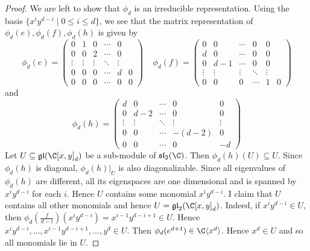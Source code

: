 \documentclass[a4paper]{article}
\begin{document}
\begin{prp}{}{}
\begin{proof}
We are left to show that $\phi_d$ is an irreducible representation. Using the basis $\{x^iy^{d-i}\;|\;0\leq i\leq d\}$, we see that the matrix representation of $\phi_d(e),\phi_d(f),\phi_d(h)$ is given by $$\phi_d(e)=\begin{pmatrix}
0 & 1 & 0 & \cdots & 0\\
0 & 0 & 2 & \cdots & 0\\
\vdots & \vdots & \vdots & \ddots & \vdots \\
0 & 0 & 0 & \cdots & d & 0\\
0 & 0 & 0 & \cdots & 0 & 0
\end{pmatrix}\;\;\;\;\phi_d(f)=\begin{pmatrix}
0 & 0 & \cdots & 0 & 0\\
d & 0 & \cdots & 0 & 0\\
0 & d-1 & \cdots & 0 & 0\\
\vdots & \vdots & \vdots & \ddots & \vdots \\
0 & 0 & 0 & \cdots & 1 & 0
\end{pmatrix}$$ and $$\phi_d(h)=\begin{pmatrix}
d & 0 & \cdots & 0 & 0\\
0 & d-2 & \cdots & 0 & 0\\
\vdots & \vdots & \ddots & \vdots & \vdots\\
0 & 0 & \cdots & -(d-2) & 0\\
0 & 0 & \cdots & 0 & -d
\end{pmatrix}$$
Let $U\subseteq\mathfrak{gl}(\C[x,y]_d)$ be a sub-module of $\mathfrak{sl}_2(\C)$. Then $\phi_d(h)(U)\subseteq U$. Since $\phi_d(h)$ is diagonal, $\phi_d(h)|_U$ is also diagonalizable. Since all eigenvalues of $\phi_d(h)$ are different, all its eigenspaces are one dimensional and is spanned by $x^iy^{d-i}$ for each $i$. Hence $U$ contains some monomial $x^iy^{d-i}$. I claim that $U$ contains all other monomials and hence $U=\mathfrak{gl}_2(\C[x,y]_d)$. Indeed, if $x^iy^{d-i}\in U$, then $\phi_d\left(\frac{f}{d-i}\right)(x^iy^{d-i})=x^{i-1}y^{d-i+1}\in U$. Hence $x^iy^{d-i},\dots,x^{i-1}y^{d-i+1},\dots,y^d\in U$. Then $\phi_d(e^{d+1})\in\C\langle x^d\rangle$. Hence $x^d\in U$ and so all monomials lie in $U$. 
\end{proof}
\end{prp}
\end{document}
